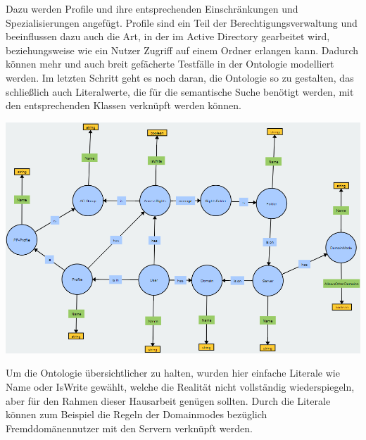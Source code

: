 Dazu werden Profile und ihre entsprechenden Einschränkungen und Spezialisierungen angefügt. Profile sind ein Teil der Berechtigungsverwaltung und beeinflussen dazu auch die Art, in der im Active Directory gearbeitet wird, beziehungsweise wie ein Nutzer Zugriff auf einem Ordner erlangen kann. Dadurch können mehr und auch breit gefächerte Testfälle in der Ontologie modelliert werden. Im letzten Schritt geht es noch daran, die Ontologie so zu gestalten, das schließlich auch Literalwerte, die für die semantische Suche benötigt werden, mit den entsprechenden Klassen verknüpft werden können. 

\begin{center}
    \includegraphics[width=1\textwidth]{Thesis/Images/OntologyLiterals.png}
\end{center}

Um die Ontologie übersichtlicher zu halten, wurden hier einfache Literale wie \glqq Name \grqq{} oder \glqq IsWrite\grqq{} gewählt, welche die Realität nicht vollständig wiederspiegeln, aber für den Rahmen dieser Hausarbeit genügen sollten. Durch die Literale können zum Beispiel die Regeln der Domainmodes bezüglich Fremddomänennutzer mit den Servern verknüpft werden. 